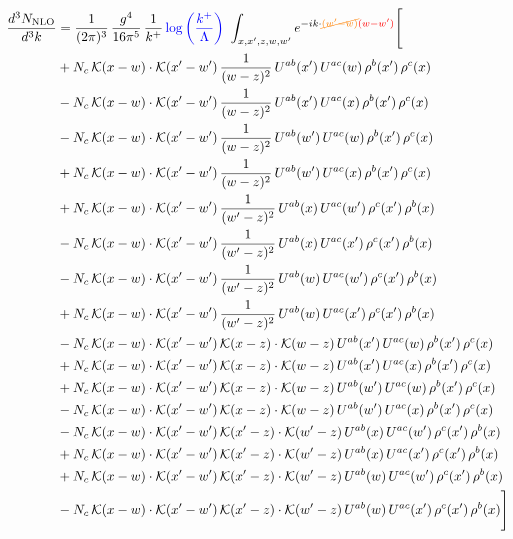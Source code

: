 \documentclass[9pt]{article}
\numberwithin{equation}{section}
\begin{document}
\begin{align}
\frac{d^3N_{\rm NLO}}{d^3k} & =  \frac{1}{(2\pi)^{3}}\,\frac{g^{4}}{16\pi^{5}}\,\frac{1}{k^{+}}\,{\color{blue}\log{\left(\frac{k^{+}}{\Lambda}\right)}}\,\, \int_{x,x',z,w,w'}e^{-ik\cdot{\color{orange}\cancel{(w'-w)}}{\color{red}(w-w')}}\Bigg[\notag\\
&+N_{c}\,\mathcal{K}(x-w)\cdot\mathcal{K}(x'-w')\,\frac{1}{(w-z)^{2}}\,U^{ab}(x')\,U^{ac}(w)\,\rho^{b}(x')\,\rho^{c}(x)\notag\\
&-N_{c}\,\mathcal{K}(x-w)\cdot\mathcal{K}(x'-w')\,\frac{1}{(w-z)^{2}}\,U^{ab}(x')\,U^{ac}(x)\,\rho^{b}(x')\,\rho^{c}(x)\notag\\
&-N_{c}\,\mathcal{K}(x-w)\cdot\mathcal{K}(x'-w')\,\frac{1}{(w-z)^{2}}\,U^{ab}(w')\,U^{ac}(w)\,\rho^{b}(x')\,\rho^{c}(x)\notag\\
&+N_{c}\,\mathcal{K}(x-w)\cdot\mathcal{K}(x'-w')\,\frac{1}{(w-z)^{2}}\,U^{ab}(w')\,U^{ac}(x)\,\rho^{b}(x')\,\rho^{c}(x)\notag\\
&+N_{c}\,\mathcal{K}(x-w)\cdot\mathcal{K}(x'-w')\,\frac{1}{(w'-z)^{2}}\,U^{ab}(x)\,U^{ac}(w')\,\rho^{c}(x')\,\rho^{b}(x)\notag\\
&-N_{c}\,\mathcal{K}(x-w)\cdot\mathcal{K}(x'-w')\,\frac{1}{(w'-z)^{2}}\,U^{ab}(x)\,U^{ac}(x')\,\rho^{c}(x')\,\rho^{b}(x)\notag\\
&-N_{c}\,\mathcal{K}(x-w)\cdot\mathcal{K}(x'-w')\,\frac{1}{(w'-z)^{2}}\,U^{ab}(w)\,U^{ac}(w')\,\rho^{c}(x')\,\rho^{b}(x)\notag\\
&+N_{c}\,\mathcal{K}(x-w)\cdot\mathcal{K}(x'-w')\,\frac{1}{(w'-z)^{2}}\,U^{ab}(w)\,U^{ac}(x')\,\rho^{c}(x')\,\rho^{b}(x)\notag\\
&-N_{c}\,\mathcal{K}(x-w)\cdot\mathcal{K}(x'-w')\,\mathcal{K}(x-z)\cdot\mathcal{K}(w-z)\,U^{ab}(x')\,U^{ac}(w)\,\rho^{b}(x')\,\rho^{c}(x)\notag\\
&+N_{c}\,\mathcal{K}(x-w)\cdot\mathcal{K}(x'-w')\,\mathcal{K}(x-z)\cdot\mathcal{K}(w-z)\,U^{ab}(x')\,U^{ac}(x)\,\rho^{b}(x')\,\rho^{c}(x)\notag\\
&+N_{c}\,\mathcal{K}(x-w)\cdot\mathcal{K}(x'-w')\,\mathcal{K}(x-z)\cdot\mathcal{K}(w-z)\,U^{ab}(w')\,U^{ac}(w)\,\rho^{b}(x')\,\rho^{c}(x)\notag\\
&-N_{c}\,\mathcal{K}(x-w)\cdot\mathcal{K}(x'-w')\,\mathcal{K}(x-z)\cdot\mathcal{K}(w-z)\,U^{ab}(w')\,U^{ac}(x)\,\rho^{b}(x')\,\rho^{c}(x)\notag\\
&-N_{c}\,\mathcal{K}(x-w)\cdot\mathcal{K}(x'-w')\,\mathcal{K}(x'-z)\cdot\mathcal{K}(w'-z)\,U^{ab}(x)\,U^{ac}(w')\,\rho^{c}(x')\,\rho^{b}(x)\notag\\
&+N_{c}\,\mathcal{K}(x-w)\cdot\mathcal{K}(x'-w')\,\mathcal{K}(x'-z)\cdot\mathcal{K}(w'-z)\,U^{ab}(x)\,U^{ac}(x')\,\rho^{c}(x')\,\rho^{b}(x)\notag\\
&+N_{c}\,\mathcal{K}(x-w)\cdot\mathcal{K}(x'-w')\,\mathcal{K}(x'-z)\cdot\mathcal{K}(w'-z)\,U^{ab}(w)\,U^{ac}(w')\,\rho^{c}(x')\,\rho^{b}(x)\notag\\
&-N_{c}\,\mathcal{K}(x-w)\cdot\mathcal{K}(x'-w')\,\mathcal{K}(x'-z)\cdot\mathcal{K}(w'-z)\,U^{ab}(w)\,U^{ac}(x')\,\rho^{c}(x')\,\rho^{b}(x)\Bigg]
\end{align}
\end{document}
